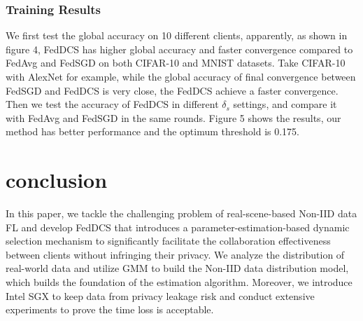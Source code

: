 \documentclass[conference]{IEEEtran}
\begin{document}
 
\subsubsection{Training Results}
We first test the global accuracy on 10 different clients, apparently, 
as shown in figure 4, FedDCS has higher global accuracy and faster convergence 
compared to FedAvg and FedSGD on both CIFAR-10 and MNIST datasets. 
Take CIFAR-10 with AlexNet for example, while the global accuracy of 
final convergence between FedSGD and FedDCS is very close, the FedDCS
 achieve a faster convergence. Then we test the accuracy of 
 FedDCS in different $\delta_s$ settings, and compare it with FedAvg 
 and FedSGD in the same rounds. Figure 5 shows the results, our method has better
  performance and the optimum threshold is 0.175.

\section{conclusion}
In this paper, we tackle the challenging problem of 
real-scene-based Non-IID data FL and develop 
FedDCS that introduces a parameter-estimation-based dynamic selection
mechanism to significantly facilitate the collaboration effectiveness
between clients without infringing their privacy. We analyze the 
distribution of real-world data and utilize GMM to build the Non-IID
data distribution model, which builds the foundation of the estimation
algorithm. Moreover, we introduce Intel SGX to keep data from privacy
leakage risk and conduct extensive experiments to prove the time loss is acceptable.

\newpage


\end{document}
